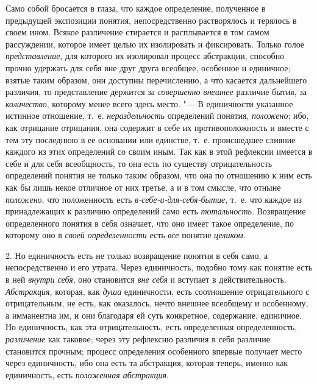 {Само собой бросается в глаза, что каждое определение,
полученное в предыдущей экспозиции понятия, непосредственно растворялось и
терялось в своем ином. Всякое различение стирается и расплывается в том
самом рассуждении, которое имеет целью их изолировать и фиксировать. Только
голое {\em представление},
для которого их изолировал процесс абстракции, способно
прочно удержать для себя вне друг друга всеобщее, особенное и единичное;
взятые таким образом, они доступны перечислению, а что касается дальнейшего
различия, то представление держится за
{\em совершенно внешнее}
различие бытия, за
{\em количество},
которому менее всего здесь место. "--- В
единичности указанное истинное отношение, т.~е.
{\em нераздельность}
определений понятия,
{\em положено}; ибо, как
отрицание отрицания, она содержит в себе их противоположность и вместе с
тем эту последнюю в ее основании или единстве, т.~е. происшедшее слияние
каждого из этих определений со своим иным. Так как в этой рефлексии
имеется в себе и для себя всеобщность, то она есть по существу
отрицательность определений понятия не только таким образом, что она по
отношению к ним есть как бы лишь некое отличное от них третье, а и в том
смысле, что отныне {\em положено},
что положенность есть
{\em в-себе-и-для-себя-бытие},
т.~е. что каждое из принадлежащих к различию определений само
есть {\em тотальность}.
Возвращение определенного понятия в себя означает, что оно
имеет такое определение, по которому оно в
{\em своей определенности}
есть {\em все} понятие {\em целиком}.

2. Но единичность есть не только возвращение понятия в себя
само, а непосредственно и его утрата. Через единичность, подобно тому как
понятие есть в ней
{\em внутри себя}, оно
становится {\em вне себя}
и вступает в действительность.
{\em Абстракция},
которая, как {\em душа}
единичности, есть соотношение отрицательного с отрицательным,
не есть, как оказалось, нечто внешнее всеобщему и особенному, а имманентна
им, и они благодаря ей суть конкретное, содержание, единичное. Но
единичность, как эта отрицательность, есть определенная определенность,
{\em различение} как
таковое; через эту рефлексию различия в себя различие становится прочным;
процесс определения особенного впервые получает место через единичность,
ибо она есть та абстракция, которая теперь, именно как единичность, есть
{\em положенная абстракция}.

}
